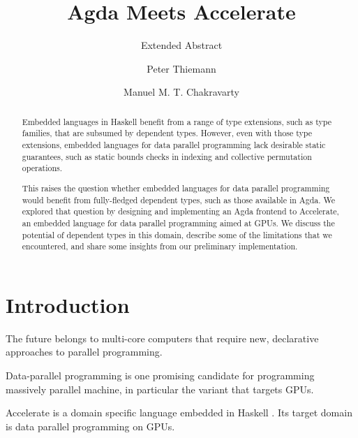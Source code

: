\documentclass{llncs}
\begin{document}
%
\title{Agda Meets Accelerate}
\subtitle{Extended Abstract}
\author{Peter Thiemann \and Manuel M. T. Chakravarty}

\maketitle              %

\begin{abstract}  
  Embedded languages in Haskell benefit from a range of type extensions, such as type families, that are subsumed by dependent types. However, even with those type extensions, embedded languages for data parallel programming lack desirable static guarantees, such as static bounds checks in indexing and collective permutation operations.
  
  This raises the question whether embedded languages for data parallel programming would benefit from fully-fledged dependent types, such as those available in Agda. We explored that question by designing and implementing an Agda frontend to Accelerate, an embedded language for data parallel programming aimed at GPUs. We discuss the potential of dependent types in this domain, describe some of the limitations that we encountered, and share some insights from our preliminary implementation.
\end{abstract}
\thispagestyle{plain}
\pagestyle{plain}
%
\section{Introduction}
\label{sec:introduction}

The future belongs to multi-core computers that require new,
declarative approaches to parallel programming. 

Data-parallel programming is one promising candidate for programming
massively parallel machine, in particular the variant that targets
GPUs.

Accelerate \cite{ChakravartyKellerLeeMcdonellGrover2011} is a domain
specific language embedded in Haskell \cite{PeytonJones2003}. Its
target domain is data parallel programming on GPUs.
\end{document}
